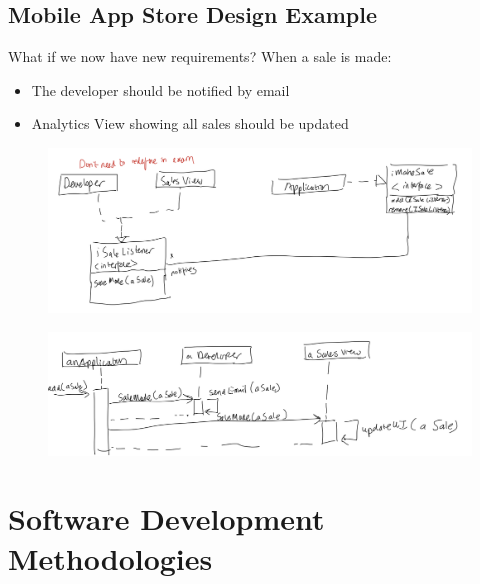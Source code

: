 \documentclass{article}
\begin{document}
\subsection{Mobile App Store Design Example}

What if we now have new requirements? When a sale is made:
\begin{itemize}
    \item The developer should be notified by email
    \item Analytics View showing all sales should be updated
\end{itemize}
\begin{figure}[H]
    \centering
    \includegraphics[width=0.8\linewidth]{Pictures/Screenshot 2023-02-08 at 11.55.08.png}
\end{figure}
\begin{figure}[H]
    \centering
\includegraphics[width=0.8\linewidth]{Pictures/Screenshot 2023-02-08 at 11.55.20.png}
\end{figure}
\section{Software Development Methodologies}
\end{document}
